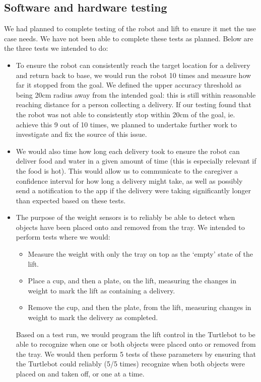 \documentclass{article}
\begin{document}
\subsection{Software and hardware testing}
\label{testing}
We had planned to complete testing of the robot and lift to ensure it met the use case needs. We have not been able to complete these tests as planned. Below are the three tests we intended to do:

\begin{itemize}
\item To ensure the robot can consistently reach the target location for a delivery and return back to base, we would run the robot 10 times and measure how far it stopped from the goal. We defined the upper accuracy threshold as being 20cm radius away from the intended goal: this is still within reasonable reaching distance for a person collecting a delivery. If our testing found that the robot was not able to consistently stop within 20cm of the goal, ie. achieve this 9 out of 10 times, we planned to undertake further work to investigate and fix the source of this issue. 
\item We would also time how long each delivery took to ensure the robot can deliver food and water in a given amount of time (this is especially relevant if the food is hot). This would allow us to communicate to the caregiver a confidence interval for how long a delivery might take, as well as possibly send a notification to the app if the delivery were taking significantly longer than expected based on these tests.
\item The purpose of the weight sensors is to reliably be able to detect when objects have been placed onto and removed from the tray. We intended to perform tests where we would:
  \begin{itemize}
    \item Measure the weight with only the tray on top as the `empty' state of the lift.
    \item Place a cup, and then a plate, on the lift, measuring the changes in weight to mark the lift as containing a delivery. 
    \item Remove the cup, and then the plate, from the lift, measuring changes in weight to mark the delivery as completed. 
  \end{itemize}
  Based on a test run, we would program the lift control in the Turtlebot to be able to recognize when one or both objects were placed onto or removed from the tray. We would then perform 5 tests of these parameters by ensuring that the Turtlebot could reliably (5/5 times) recognize when both objects were placed on and taken off, or one at a time. 
\end{itemize}
\end{document}
